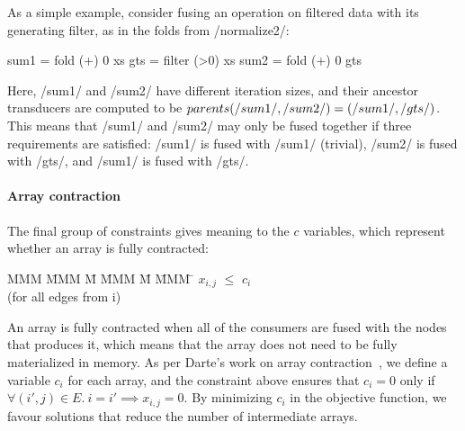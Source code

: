 As a simple example, consider fusing an operation on filtered data with its generating filter, as in the folds from \Hs/normalize2/:
\begin{haskell}
    sum1 = fold (+) 0  xs
    gts  = filter (>0) xs
    sum2 = fold (+) 0  gts
\end{haskell}

Here, \Hs/sum1/ and \Hs/sum2/ have different iteration sizes, and their ancestor transducers are computed to be $parents(\Hs/sum1/, \Hs/sum2/) = (\Hs/sum1/, \Hs/gts/)$.
This means that \Hs/sum1/ and \Hs/sum2/ may only be fused together if three requirements are satisfied: \Hs/sum1/ is fused with \Hs/sum1/ (trivial), \Hs/sum2/ is fused with \Hs/gts/, and \Hs/sum1/ is fused with \Hs/gts/.




\paragraph{Array contraction} The final group of constraints gives meaning to the $c$ variables, which represent whether an array is fully contracted:
\begin{tabbing}
MMM     \= MMM \= M \= MMM \= M \= MMM \= \kill
        \> $x_{i,j}$    \> $\le$ \> $c_i$  \> \> \\
        \> (for all edges from i)
\end{tabbing}

An array is fully contracted when all of the consumers are fused with the nodes that produces it, which means that the array does not need to be fully materialized in memory.
As per Darte's work on array contraction~\cite{darte2002contraction}, we define a variable $c_i$ for each array, and the constraint above ensures that $c_i = 0$ only if $\forall (i',j) \in E.\ i = i' \implies x_{i,j} = 0$.
By minimizing $c_i$ in the objective function, we favour solutions that reduce the number of intermediate arrays.


